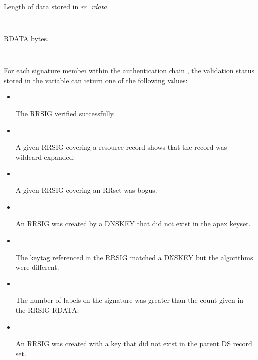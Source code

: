 \begin{description}
\begin{description}

\item {}\verb" "

Length of data stored in {\it rr\_rdata}.

\item {}\verb" "

RDATA bytes.

\item {}\verb" "

For each signature  member within the authentication chain
, the validation status stored in the variable
 can return one of the following values:

\begin{itemize}

\item {}\verb" "

The RRSIG verified successfully.

\item {}\verb" "

A given RRSIG covering a resource record shows that the record was wildcard
expanded.

\item {}\verb" "

A given RRSIG covering an RRset was bogus.

\item {}\verb" "

An RRSIG was created by a DNSKEY that did not exist in the apex keyset.

\item {}\verb" "

The keytag referenced in the RRSIG matched a DNSKEY but the algorithms were
different.

\item {}\verb" "

The number of labels on the signature was greater than the count given in
the RRSIG RDATA.

\item {}\verb" "

An RRSIG was created with a key that did not exist in the parent DS record
set.


\end{itemize}
\end{description}
\end{description}
